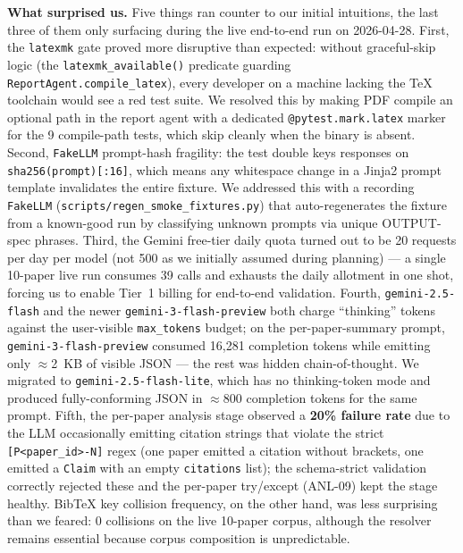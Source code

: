 \documentclass[12pt,a4paper]{article}
\begin{document}
\textbf{What surprised us.} Five things ran counter to our initial intuitions,
the last three of them only surfacing during the live end-to-end run on
2026-04-28. First, the \texttt{latexmk} gate proved more disruptive than
expected: without graceful-skip logic (the \texttt{latexmk\_available()}
predicate guarding \texttt{ReportAgent.compile\_latex}), every developer on a
machine lacking the TeX toolchain would see a red test suite. We resolved this
by making PDF compile an optional path in the report agent with a dedicated
\texttt{@pytest.mark.latex} marker for the 9 compile-path tests, which skip
cleanly when the binary is absent. Second, \texttt{FakeLLM} prompt-hash
fragility: the test double keys responses on \texttt{sha256(prompt)[:16]}, which
means any whitespace change in a Jinja2 prompt template invalidates the entire
fixture. We addressed this with a recording \texttt{FakeLLM}
(\texttt{scripts/regen\_smoke\_fixtures.py}) that auto-regenerates the fixture
from a known-good run by classifying unknown prompts via unique OUTPUT-spec
phrases. Third, the Gemini free-tier daily quota turned out to be 20 requests
per day per model (not 500 as we initially assumed during planning) --- a single
10-paper live run consumes 39 calls and exhausts the daily allotment in one
shot, forcing us to enable Tier~1 billing for end-to-end validation. Fourth,
\texttt{gemini-2.5-flash} and the newer \texttt{gemini-3-flash-preview} both
charge ``thinking'' tokens against the user-visible \texttt{max\_tokens} budget;
on the per-paper-summary prompt, \texttt{gemini-3-flash-preview} consumed 16,281
completion tokens while emitting only $\approx$2~KB of visible JSON --- the
rest was hidden chain-of-thought. We migrated to
\texttt{gemini-2.5-flash-lite}, which has no thinking-token mode and produced
fully-conforming JSON in $\approx$800 completion tokens for the same prompt.
Fifth, the per-paper analysis stage observed a \textbf{20\% failure rate} due to
the LLM occasionally emitting citation strings that violate the strict
\texttt{[P<paper\_id>-N]} regex (one paper emitted a citation without
brackets, one emitted a \texttt{Claim} with an empty \texttt{citations} list);
the schema-strict validation correctly rejected these and the per-paper
try/except (ANL-09) kept the stage healthy. BibTeX key collision frequency, on
the other hand, was less surprising than we feared: 0 collisions on the live
10-paper corpus, although the resolver remains essential because corpus
composition is unpredictable.
\end{document}
